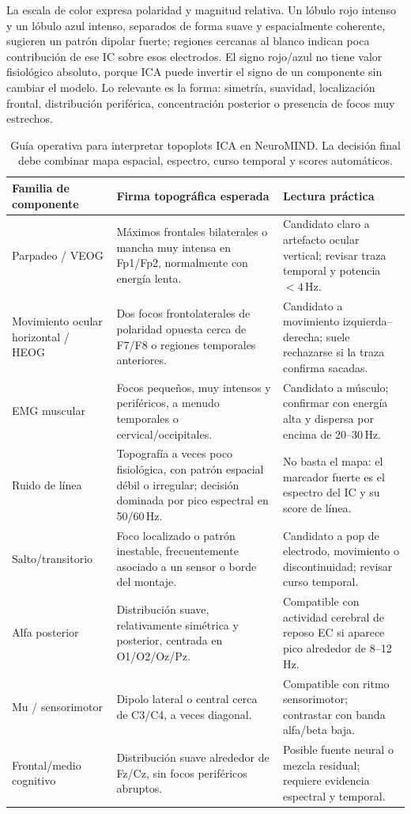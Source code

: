 La escala de color expresa polaridad y magnitud relativa. Un lóbulo rojo intenso y un lóbulo azul intenso, separados de forma suave y espacialmente coherente, sugieren un patrón dipolar fuerte; regiones cercanas al blanco indican poca contribución de ese IC sobre esos electrodos. El signo rojo/azul no tiene valor fisiológico absoluto, porque ICA puede invertir el signo de un componente sin cambiar el modelo. Lo relevante es la forma: simetría, suavidad, localización frontal, distribución periférica, concentración posterior o presencia de focos muy estrechos.

\begin{table}[H]
\centering
\small
\caption{Guía operativa para interpretar topoplots ICA en NeuroMIND. La decisión final debe combinar mapa espacial, espectro, curso temporal y scores automáticos.}
\label{tab:ica-topoplot-reading-guide}
\begin{tabular}{@{}p{}p{}p{}@{}}
\toprule
\textbf{Familia de componente} & \textbf{Firma topográfica esperada} & \textbf{Lectura práctica} \\
\midrule
Parpadeo / VEOG & Máximos frontales bilaterales o mancha muy intensa en Fp1/Fp2, normalmente con energía lenta. & Candidato claro a artefacto ocular vertical; revisar traza temporal y potencia $<4$\,Hz. \\
Movimiento ocular horizontal / HEOG & Dos focos frontolaterales de polaridad opuesta cerca de F7/F8 o regiones temporales anteriores. & Candidato a movimiento izquierda--derecha; suele rechazarse si la traza confirma sacadas. \\
EMG muscular & Focos pequeños, muy intensos y periféricos, a menudo temporales o cervical/occipitales. & Candidato a músculo; confirmar con energía alta y dispersa por encima de 20--30\,Hz. \\
Ruido de línea & Topografía a veces poco fisiológica, con patrón espacial débil o irregular; decisión dominada por pico espectral en 50/60\,Hz. & No basta el mapa: el marcador fuerte es el espectro del IC y su score de línea. \\
Salto/transitorio & Foco localizado o patrón inestable, frecuentemente asociado a un sensor o borde del montaje. & Candidato a pop de electrodo, movimiento o discontinuidad; revisar curso temporal. \\
Alfa posterior & Distribución suave, relativamente simétrica y posterior, centrada en O1/O2/Oz/Pz. & Compatible con actividad cerebral de reposo EC si aparece pico alrededor de 8--12\,Hz. \\
Mu / sensorimotor & Dipolo lateral o central cerca de C3/C4, a veces diagonal. & Compatible con ritmo sensorimotor; contrastar con banda alfa/beta baja. \\
Frontal/medio cognitivo & Distribución suave alrededor de Fz/Cz, sin focos periféricos abruptos. & Posible fuente neural o mezcla residual; requiere evidencia espectral y temporal. \\
\bottomrule
\end{tabular}
\end{table}

